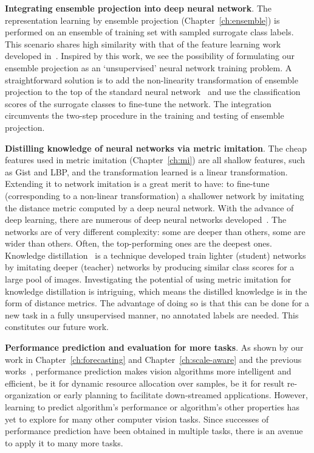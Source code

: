 \textbf{Integrating ensemble projection into deep neural network}. The  representation learning by ensemble projection (Chapter~\ref{ch:ensemble}) is performed on an ensemble of training set with sampled surrogate class labels. This scenario shares high similarity with that of the feature learning work developed in~\citep{cnnfet14}. Inspired by this work, we see the possibility of formulating our ensemble projection as an `unsupervised' neural network training problem. A straightforward solution  is to add the non-linearity transformation of ensemble projection to the top of the standard neural network~\citep{deep:bmvc14} and use the classification scores of the surrogate classes to fine-tune the network.  The integration circumvents the two-step procedure in the training and testing of ensemble projection.   


\textbf{Distilling knowledge of neural networks via metric imitation}. The cheap features used in metric imitation (Chapter~\ref{ch:mi}) are all shallow features, such as Gist and LBP, and the transformation learned is a linear transformation. Extending it to network imitation is a great merit to have: to fine-tune (corresponding to a non-linear transformation) a shallower network by imitating the distance metric computed by a deep neural network. 
With the advance of deep learning, there are numerous of deep neural networks developed~\citep{deepnet:nips12, vgg16, googlenet, ResNet}. The networks are of very different complexity: some are deeper than others, some are wider than others. Often, the top-performing ones  are the deepest ones. 
Knowledge distillation~\citep{DistillingCNN} is a technique developed train lighter (student) networks by imitating deeper (teacher) networks by producing similar class scores for a large pool of images.  Investigating the potential of using metric imitation for knowledge distillation is intriguing, which means the distilled knowledge is in the form of distance metrics. The advantage of doing so is that this can be done for a new task in a fully unsupervised manner, \ie no annotated labels are needed.  This constitutes our future work. 


\textbf{Performance prediction and evaluation for more tasks}. As shown by our work in Chapter~\ref{ch:forecasting} and Chapter~\ref{ch:scale-aware} and the previous works~\citep{matchability, flow:confidence, completion:quality}, performance prediction makes vision algorithms more intelligent and efficient, be it for dynamic resource allocation over samples, be it for result re-organization or early planning to facilitate down-streamed applications. However, learning to predict algorithm's performance or algorithm's other properties has yet to explore for many other computer vision tasks. Since successes of performance prediction have been obtained in multiple tasks, there is an avenue to apply it to many more tasks. 

